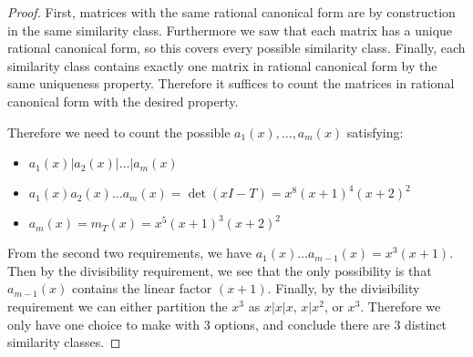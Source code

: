 \documentclass[11pt]{article}
\begin{document}
\begin{proof}
  First, matrices with the same rational canonical form are by construction in the same similarity class.
  Furthermore we saw that each matrix has a unique rational canonical form, so this covers every possible similarity class.
  Finally, each similarity class contains exactly one matrix in rational canonical form by the same uniqueness property.
  Therefore it suffices to count the matrices in rational canonical form with the desired property.

  Therefore we need to count the possible $a_1(x),\dots,a_m(x)$ satisfying:
  \begin{itemize}
  \item $a_1(x) | a_2(x) | \dots | a_m(x)$
  \item $a_1(x) a_2(x) \dots a_m(x) = \det(xI - T) = x^8(x+1)^4(x+2)^2$
  \item $a_m(x) = m_T(x) = x^5(x+1)^3(x+2)^2$
  \end{itemize}
  From the second two requirements, we have $a_1(x) \dots a_{m-1}(x) = x^3(x+1)$.
  Then by the divisibility requirement, we see that the only possibility is that $a_{m-1}(x)$ contains the linear factor $(x+1)$.
  Finally, by the divisibility requirement we can either partition the $x^3$ as $x|x|x$, $x|x^2$, or $x^3$.
  Therefore we only have one choice to make with $3$ options, and conclude there are $3$ distinct similarity classes.  
\end{proof}
\end{document}
